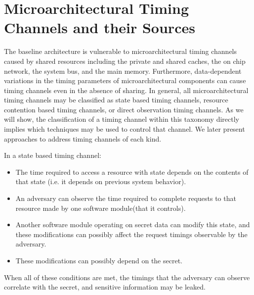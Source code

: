 \section{Microarchitectural Timing Channels and their Sources}
\label{sec:tc_sources}
The baseline architecture is vulnerable to microarchitectural timing channels 
caused by shared resources including the private and shared caches, the on chip 
network, the system bus, and the main memory. Furthermore, data-dependent 
variations in the timing parameters of microarchitectural components can cause 
timing channels even in the absence of sharing. In general, all 
microarchitectural timing channels may be classified as state based timing 
channels, resource contention based timing channels, or direct observation 
timing channels. As we will show, the classification of a timing channel within 
this taxonomy directly implies which techniques may be used to control that 
channel. We later present approaches to address timing channels of each kind.

In a state based timing channel:
\begin{itemize}
    \item The time required to access a resource with state depends on the 
        contents of that state (i.e. it depends on previous system behavior).
    \item An adversary can observe the time required to complete requests to 
        that resource made by one software module(that it controls).
    \item Another software module operating on secret data can modify this 
        state, and these modifications can possibly affect the request timings 
        observable by the adversary.
    \item These modifications can possibly depend on the secret.
\end{itemize}
When all of these conditions are met, the timings that the adversary can 
observe correlate with the secret, and sensitive information may be leaked.

